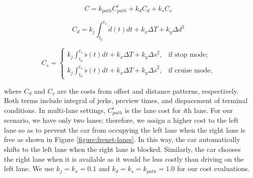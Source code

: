 \begin{equation}
  C = k_{path}C^i_{path} + k_dC_d + k_sC_s
\label{eq:cost1}
\end{equation}

\begin{equation}
  C_d = k_j\int_{t_0}^{t_1}\dddot{d}(t)dt + k_x\Delta T + k_y\Delta d^2
\label{eq:cost2}
\end{equation}

\begin{equation}
  C_s =
  \begin{cases}
    k_j\int_{t_0}^{t_1}\dddot{s}(t)dt + k_x\Delta T + k_y\Delta s^2,
    &\text{if stop mode;} \\
    k_j\int_{t_0}^{t_1}\dddot{s}(t)dt + k_x\Delta T + k_y\Delta \dot{s}^2,
    &\text{if cruise mode,}
  \end{cases}
  \label{eq:cost3}
\end{equation}

where $C_d$ and $C_s$ are the costs from offset and distance patterns,
respectively. Both terms include integral of jerks, preview times, and
dispacement of terminal conditions. In multi-lane settings, $C^i_{path}$ is the
lane cost for \textit{i}th lane. For our scenario, we have only two lanes;
therefore, we assign a higher cost to the left lane so as to prevent the car
from occupying the left lane when the right lane is free as shown in Figure
\ref{figure:frenet-lanes}. In this way, the car automatically shifts to the
left lane when the right lane is blocked. Similarly, the car chooses the right
lane when it is available as it would be less costly than driving on the left
lane. We use $k_j = k_x = 0.1$ and $k_d = k_s = k_{path} = 1.0$ for our cost
evaluations.

